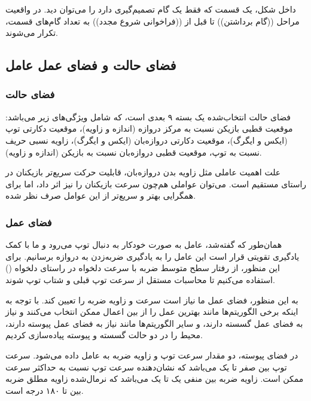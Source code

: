 داخل شکل، یک قسمت که فقط یک گام تصمیم‌گیری دارد را می‌توان دید. در واقعیت مراحل ((گام برداشتن))
تا قبل از ((فراخوانی شروع مجدد))
به تعداد گام‌های قسمت، تکرار می‌شوند.
\subsection{فضای حالت و فضای عمل عامل}
\subsubsection{فضای حالت}
فضای حالت انتخاب‌شده یک بسته ۹ بعدی است، که شامل ویژگی‌های زیر می‌باشد: موقعیت قطبی بازیکن نسبت به مرکز دروازه (اندازه و زاویه)،
موقعیت دکارتی توپ‌ (ایکس و ایگرگ)،
موقعیت دکارتی دروازه‌بان (ایکس و ایگرگ)،
زاویه نسبی حریف نسبت به توپ،
موقعیت قطبی دروازه‌بان نسبت به بازیکن (اندازه و زاویه).

علت اهمیت عاملی مثل زاویه بدن دروازه‌بان، قابلیت حرکت سریع‌تر بازیکنان در راستای مستقیم است. می‌توان عواملی هم‌چون سرعت بازیکنان را نیز اثر داد،
اما برای همگرایی بهتر و سریع‌تر از این عوامل صرف نظر شده.
\subsubsection{فضای عمل}
همان‌طور که گفته‌شد، عامل به صورت خودکار به دنبال توپ می‌رود و ما با کمک یادگیری تقویتی قرار است این عامل را به یادگیری ضربه‌زدن به دروازه برسانیم.
برای این منظور، از رفتار سطح متوسط ضربه با سرعت دلخواه در راستای دلخواه ()
 استفاده می‌کنیم تا محاسبات مستقل از سرعت توپ قبلی و شتاب توپ شوند.

 به این منظور، فضای عمل ما نیاز است سرعت و زاویه ضربه را تعیین کند.
 با توجه به اینکه برخی الگوریتم‌ها مانند  بهترین عمل را از بین اعمال ممکن انتخاب می‌کنند و نیاز به فضای عمل گسسته دارند،
و سایر الگوریتم‌ها مانند  نیاز به فضای عمل پیوسته دارند،
محیط را در دو حالت گسسته و پیوسته پیاده‌سازی کردیم.

در فضای پیوسته، دو مقدار سرعت توپ و زاویه ضربه به عامل داده می‌شود.
سرعت توپ بین صفر تا یک می‌باشد که نشان‌دهنده سرعت توپ نسبت به حداکثر سرعت ممکن است.
زاویه ضربه بین منفی یک تا یک می‌باشد که نرمال‌شده زاویه مطلق ضربه بین  تا ۱۸۰ درجه است.

